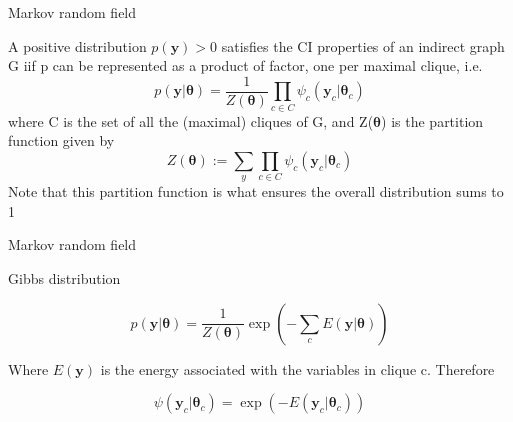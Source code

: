 \documentclass{beamer}
\begin{document}
\begin{frame}{Markov random field}
\begin{theorem}
A positive distribution $p(\textbf{y})>0$ satisfies the CI properties of an indirect graph G iif p can be represented as a product of factor, one per maximal clique,  i.e.
\begin{equation}
p(\textbf{y}|\boldsymbol{\theta})= \dfrac{1}{Z(\boldsymbol{\theta})}\prod_{c \in C }\psi_{c}(\textbf{y}_{c}|\boldsymbol{\theta}_{c})
\end{equation}
where C is the set of all the (maximal) cliques of G,  and Z($\boldsymbol{\theta}$) is the partition function given by 
\begin{equation}
Z(\boldsymbol{\theta}):= \sum_{y}\prod_{c\in C}\psi_{c}(\textbf{y}_{c}|\boldsymbol{\theta}_{c})
\end{equation}
Note that this partition function is what ensures the overall distribution sums to 1
\end{theorem}
\end{frame}


\begin{frame}{Markov random field}
\begin{center}
Gibbs distribution 
\end{center}
\begin{equation}
p(\textbf{y}|\boldsymbol{\theta})=\dfrac{1}{Z(\boldsymbol{\theta})}\exp\left(-\sum_{c}E(\textbf{y}|\boldsymbol{\theta})\right)
\end{equation}
\begin{center}
\begin{center}
Where $E(\textbf{y})$ is the energy associated with the variables in clique c. Therefore
\end{center}
\end{center}
\begin{equation}
\psi(\textbf{y}_{c}|\boldsymbol{\theta}_{c})=\exp\left(-E(\textbf{y}_{c}|\boldsymbol{\theta}_{c})\right)
\end{equation}

\end{frame}
\end{document}
